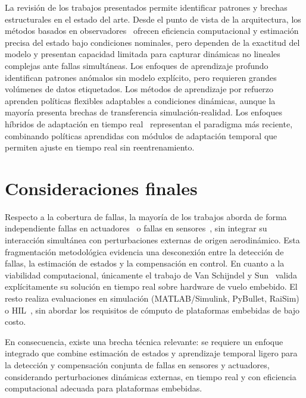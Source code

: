 La revisión de los trabajos presentados permite identificar patrones y brechas estructurales en el estado del arte. Desde el punto de vista de la arquitectura, los métodos basados en observadores~\cite{freddi2019,patan2022,du2023,bekhiti2025,amoozgar2013,wang2022,chen2023,ahmadi2023,gao2022} ofrecen eficiencia computacional y estimación precisa del estado bajo condiciones nominales, pero dependen de la exactitud del modelo y presentan capacidad limitada para capturar dinámicas no lineales complejas ante fallas simultáneas. Los enfoques de aprendizaje profundo~\cite{ozcan2024,li2021} identifican patrones anómalos sin modelo explícito, pero requieren grandes volúmenes de datos etiquetados. Los métodos de aprendizaje por refuerzo~\cite{liu2024,sohege2021,fei2020,kim2025} aprenden políticas flexibles adaptables a condiciones dinámicas, aunque la mayoría presenta brechas de transferencia simulación-realidad. Los enfoques híbridos de adaptación en tiempo real~\cite{kumar2021,giral2024,zhang2023,hsu2024,kim2025} representan el paradigma más reciente, combinando políticas aprendidas con módulos de adaptación temporal que permiten ajuste en tiempo real sin reentrenamiento.

\section{Consideraciones finales}

Respecto a la cobertura de fallas, la mayoría de los trabajos aborda de forma independiente fallas en actuadores~\cite{freddi2019,wang2022,chen2023,ahmadi2023,liu2024,sohege2021,kim2025,amoozgar2013} o fallas en sensores~\cite{patan2022,bekhiti2025,fei2020}, sin integrar su interacción simultánea con perturbaciones externas de origen aerodinámico. Esta fragmentación metodológica evidencia una desconexión entre la detección de fallas, la estimación de estados y la compensación en control. En cuanto a la viabilidad computacional, únicamente el trabajo de Van Schijndel y Sun~\cite{schijndel2021} valida explícitamente su solución en tiempo real sobre hardware de vuelo embebido. El resto realiza evaluaciones en simulación (MATLAB/Simulink, PyBullet, RaiSim) o HIL~\cite{ahmadi2023}, sin abordar los requisitos de cómputo de plataformas embebidas de bajo costo.

En consecuencia, existe una brecha técnica relevante: se requiere un enfoque integrado que combine estimación de estados y aprendizaje temporal ligero para la detección y compensación conjunta de fallas en sensores y actuadores, considerando perturbaciones dinámicas externas, en tiempo real y con eficiencia computacional adecuada para plataformas embebidas. 